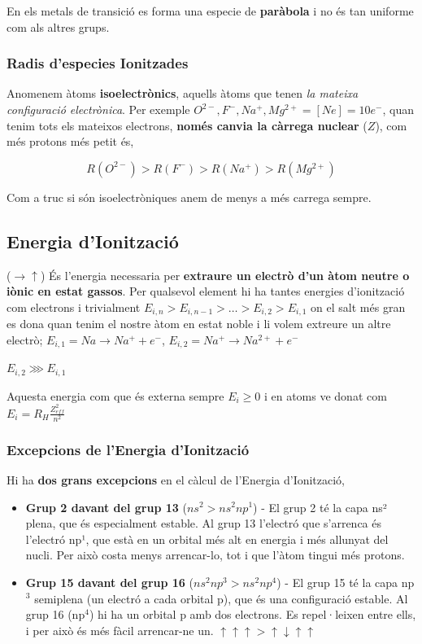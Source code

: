 \documentclass[12pt]{article}
\begin{document}
En els metals de transició es forma una especie de \textbf{paràbola} i no és tan uniforme com als altres grups.

\subsubsection{Radis d'especies Ionitzades}

Anomenem àtoms \textbf{isoelectrònics}, aquells àtoms que tenen \textit{la mateixa configuració electrònica}. Per exemple $O^{2-}, F^-, Na^+, Mg^{2+} = [Ne] = 10 e^-$, quan tenim tots els mateixos electrons, \textbf{només canvia la càrrega nuclear} ($Z$), com més protons més petit és,

\[R(O^{2-}) > R(F^-) > R(Na^+) > R(Mg^{2+})\]

Com a truc si són isoelectròniques anem de menys a més carrega sempre.

\subsection{Energia d'Ionització}

($\rightarrow\uparrow$) És l'energia necessaria per \textbf{extraure un electrò d'un àtom neutre o iònic en estat gassos}. Per qualsevol element hi ha tantes energies d'ionització com electrons i trivialment $E_{i,n} > E_{i,n-1} > \dots > E_{i,2} > E_{i,1}$ on el salt més gran es dona quan tenim el nostre àtom en estat noble i li volem extreure un altre electrò; $E_{i,1} = Na \rightarrow Na^+ + e^-$, $E_{i,2} = Na^+ \rightarrow Na^{2+} + e^-$

$E_{i,2} \ggg E_{i,1}$

Aquesta energia com que és externa sempre $E_{i} \geq 0$ i en atoms ve donat com $E_i = R_H\frac{Z_{eff}^2}{n^2}$

\subsubsection{Excepcions de l'Energia d'Ionització}

Hi ha \textbf{dos grans excepcions} en el càlcul de l'Energia d'Ionització,

\begin{itemize}
    \item \textbf{Grup 2 davant del grup 13} ($ns^2 > ns^2np^1$) - El grup 2 té la capa ns² plena, que és especialment estable. Al grup 13 l'electró que s'arrenca és l'electró np¹, que està en un orbital més alt en energia i més allunyat del nucli. Per això costa menys arrencar-lo, tot i que l'àtom tingui més protons.
    \item \textbf{Grup 15 davant del grup 16} ($ns^2 np^3 > ns^2 np^4$) - El grup 15 té la capa np$^3$ semiplena (un electró a cada orbital p), que és una configuració estable. Al grup 16 (np$^4$) hi ha un orbital p amb dos electrons. Es repel·leixen entre ells, i per això és més fàcil arrencar-ne un. $\boxed{\uparrow}\boxed{\uparrow}\boxed{\uparrow} > \boxed{\uparrow\downarrow}\boxed{\uparrow}\boxed{\uparrow} $
\end{itemize}
\end{document}
